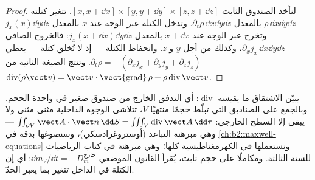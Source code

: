 \begin{proof}
لنأخذ الصندوق الثابت $[x, x + \dd x]\times[y, y + \dd y]\times[z, z + \dd z]$.
تتغير كتلته $\rho\,\dd x\dd y\dd z$ بالمعدل $\partial_t\rho\,\dd x\dd y
\dd z$. وتدخل الكتلة عبر الوجه عند $x$ بالمعدل $j_x(x)\dd y\dd z$
وتخرج عبر الوجه عند $x + \dd x$ بالمعدل $j_x(x + \dd x)\dd y\dd z$:
فالخروج الصافي $\partial_xj_x\,\dd x\dd y\dd z$، وكذلك من أجل $y$ و $z$.
وانحفاظ الكتلة --- إذ لا تُخلق كتلة --- يعطي $\partial_t\rho = -
(\partial_xj_x + \partial_yj_y + \partial_zj_z)$. وتنتج الصيغة الثانية من
$\operatorname{div}(\rho\vect v) = \vect v\cdot\operatorname{\vect{grad}}\rho +
\rho\operatorname{div}\vect v$.
\end{proof}

\begin{remark}\label{rem:b2:fluid-kinematics:divergence}
يبيّن الاشتقاق ما يقيسه $\operatorname{div}$: أي التدفق الخارج من
صندوق صغير في واحدة الحجم. وبالجمع على الصناديق التي تبلّط
حجمًا منتهيًا $V$، تتلاشى الوجوه الداخلية مثنى مثنى ولا يبقى
إلا السطح الخارجي: $\iint_{\partial V}\vect A\cdot\vect n\,\dd S = \iiint_V
\operatorname{div}\vect A\,\dd\tau$ --- وهي مبرهنة التباعد
(أوستروغرادسكي)، وسنصوغها بدقة في \cref{ch:b2:maxwell-equations}
ونستعملها في الكهرمغناطيسية كلها؛ وهي مبرهنة في كتاب
الرياضيات للسنة الثالثة. ومكاملًا على حجم ثابت، يُقرأ القانون
الموضعي $\dd m_V/\dd t = -D_m^{\text{خارج}}$: أي إن الكتلة في الداخل
تتغير بما يعبر الحدّ.
\end{remark}

